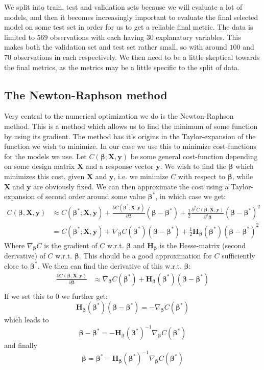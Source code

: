 \documentclass{article}
\begin{document}
We split into train, test and validation sets because we will evaluate a lot of
models, and then it becomes increasingly important to evaluate the final
selected model on some test set in order for us to get a reliable final metric.
The data is limited to $569$ observations with each having $30$ explanatory
variables. This makes both the validation set and test set rather small, so with
around $100$ and $70$ observations in each respectively. We then need to be a
little skeptical towards the final metrics, as the metrics may be a little
specific to the split of data.

\subsection{The Newton-Raphson method}
Very central to the numerical optimization we do is the Newton-Raphson method.
This is a method which allows us to find the minimum of some function by using
its gradient. The method has it's origins in the Taylor-expansion of the
function we wish to minimize. In our case we use this to minimize cost-functions
for the models we use. Let $C(\bm{\beta}; \bm{X}, \bm{y})$ be some general
cost-function depending on some design matrix $\bm{X}$ and a response vector
$\bm{y}$. We wish to find the $\bm{\beta}$ which minimizes this cost, given
$\bm{X}$ and $\bm{y}$, i.e. we minimize $C$ with respect to $\bm{\beta}$, while
$\bm{X}$ and $\bm{y}$ are obviously fixed. We can then approximate the cost using a
Taylor-expansion of second order around some value $\bm{\beta}^*$, in which case
we get:
\begin{align*}
      C(\bm{\beta}, \bm{X}, \bm{y}) & \approx C(\bm{\beta}^*; \bm{X}, \bm{y}) + \frac{\partial C(\bm{\beta}^*; \bm{X}, \bm{y})}{\partial \bm{\beta}}(\bm{\beta} - \bm{\beta}^*) + \frac{1}{2} \frac{\partial^2 C(\bm{\beta}; \bm{X}, \bm{y})}{\partial^2 \bm{\beta}}(\bm{\beta} - \bm{\beta}^*)^2 \\
                                    & = C(\bm{\beta}^*; \bm{X}, \bm{y}) + \nabla_{\bm{\beta}} C(\bm{\beta}^*) (\bm{\beta} - \bm{\beta}^*) + \frac{1}{2} \bm{H}_{\bm{\beta}}(\bm{\beta}^*) (\bm{\beta} - \bm{\beta}^*)^2
\end{align*}
Where $\nabla_{\bm{\beta}} C$ is the gradient of $C$ w.r.t. $\bm{\beta}$ and
$\bm{H}_{\bm{\beta}}$ is the Hesse-matrix (second derivative) of $C$ w.r.t.
$\bm{\beta}$. This should be a good approximation for $C$ sufficiently close to
$\bm{\beta}^*$. We then can find the derivative of this w.r.t. $\bm{\beta}$:
\begin{align*}
      \frac{\partial C(\bm{\beta}, \bm{X}, \bm{y})}{\partial \bm{\beta}} & \approx
      \nabla_{\bm{\beta}} C(\bm{\beta}^*) + \bm{H}_{\bm{\beta}}(\bm{\beta}^*)(\bm{\beta} - \bm{\beta}^*) \\
\end{align*}
If we set this to $0$ we further get:
$$\bm{H}_{\bm{\beta}}(\bm{\beta}^*) (\bm{\beta} - \bm{\beta}^*) = -\nabla_{\bm{\beta}} C(\bm{\beta}^*)$$
which leads to
$$\bm{\beta} - \bm{\beta}^* = - \bm{H}_{\bm{\beta}}(\bm{\beta}^*)^{-1} \nabla_{\bm{\beta}} C(\bm{\beta}^*)$$
and finally
$$\bm{\beta} = \bm{\beta}^* - \bm{H}_{\bm{\beta}}(\bm{\beta}^*)^{-1} \nabla_{\bm{\beta}} C(\bm{\beta}^*)$$
\end{document}
